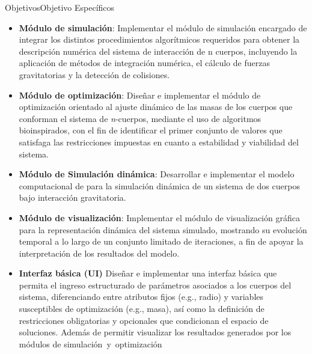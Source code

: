\begin{frame}[allowframebreaks]{Objetivos}{Objetivo Específicos}%
    \begin{itemize}
        \item \textbf{\fontsize{10pt}{12pt}\selectfont Módulo de simulación}: {\fontsize{8pt}{10pt}\selectfont Implementar el módulo de simulación encargado de integrar los distintos procedimientos algorítmicos requeridos para obtener la descripción numérica del sistema de interacción de n cuerpos, incluyendo la aplicación de métodos de integración numérica, el cálculo de fuerzas gravitatorias y la detección de colisiones.}
        \item \textbf{\fontsize{10pt}{12pt}\selectfont Módulo de optimización}: {\fontsize{8pt}{10pt}\selectfont
        Diseñar e implementar el módulo de optimización orientado al ajuste dinámico de las masas de los cuerpos que conforman el sistema de \textit{n}-cuerpos, mediante el uso de algoritmos bioinspirados, con el fin de identificar el primer conjunto de valores que satisfaga las restricciones impuestas en cuanto a estabilidad y viabilidad del sistema.
        }
        \item \textbf{\fontsize{10pt}{12pt}\selectfont Módulo de Simulación dinámica}: {\fontsize{8pt}{10pt}\selectfont
        Desarrollar e implementar el modelo computacional de para la simulación dinámica de un sistema de dos cuerpos bajo interacción gravitatoria.
        }
        \item \textbf{\fontsize{10pt}{12pt}\selectfont Módulo de visualización}: {\fontsize{8pt}{10pt}\selectfont
        Implementar el módulo de visualización gráfica para la representación dinámica del sistema simulado, mostrando su evolución temporal a lo largo de un conjunto limitado de iteraciones, a fin de apoyar la interpretación de los resultados del modelo.
        }
        \item \textbf{\fontsize{10pt}{12pt}\selectfont Interfaz básica (UI)}{\fontsize{8pt}{10pt}\selectfont
        Diseñar e implementar una interfaz básica que permita el ingreso estructurado de parámetros asociados a los cuerpos del sistema, diferenciando entre atributos fijos (e.g., radio) y variables susceptibles de optimización (e.g., masa), así como la definición de restricciones obligatorias y opcionales que condicionan el espacio de soluciones. Además de permitir visualizar los resultados generados por los módulos de simulación y optimización
        }
    \end{itemize}
\end{frame}

